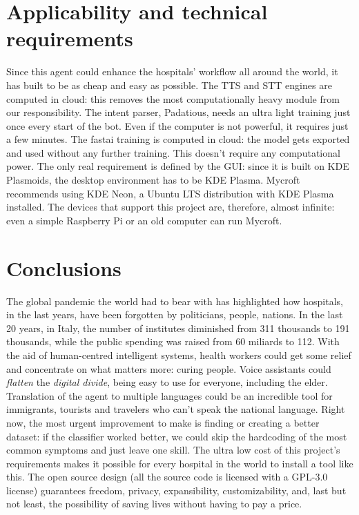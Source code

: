 \documentclass[conference]{IEEEtran}
\begin{document}
\section{Applicability and technical requirements}
\label{sec:applicability}
Since this agent could enhance the hospitals' workflow all around the world, it has built to be as cheap and easy as possible. The TTS and STT engines are computed in cloud: this removes the most computationally heavy module from our responsibility. The intent parser, Padatious, needs an ultra light training just once every start of the bot. Even if the computer is not powerful, it requires just a few minutes. The fastai training is computed in cloud: the model gets exported and used without any further training. This doesn't require any computational power. The only real requirement is defined by the GUI: since it is built on KDE Plasmoids, the desktop environment has to be KDE Plasma. Mycroft recommends using KDE Neon, a Ubuntu LTS distribution with KDE Plasma installed. The devices that support this project are, therefore, almost infinite: even a simple Raspberry Pi or an old computer can run Mycroft.
\section{Conclusions}
\label{sec:conclusions}
The global pandemic the world had to bear with has highlighted how hospitals, in the last years, have been forgotten by politicians, people, nations. In the last 20 years, in Italy, the number of institutes diminished from 311 thousands to 191 thousands, while the public spending was raised from 60 miliards to 112\cite{ospedali-agi}. With the aid of human-centred intelligent systems, health workers could get some relief and concentrate on what matters more: curing people. Voice assistants could \textit{flatten} the
\textit{digital divide}, being easy to use for everyone, including the elder. Translation of the agent to multiple languages could be an incredible tool for immigrants, tourists and travelers who can't speak the national language. Right now, the most urgent improvement to make is finding or creating a better dataset: if the classifier worked better, we could skip the hardcoding of the most common symptoms and just leave one skill. The ultra low cost of this project's requirements makes it possible for every hospital in the world to install a tool like this. The open source design (all the source code is licensed with a GPL-3.0 license) guarantees freedom, privacy, expansibility, customizability, and, last but not least, the possibility of saving lives without having to pay a price.
\end{document}
